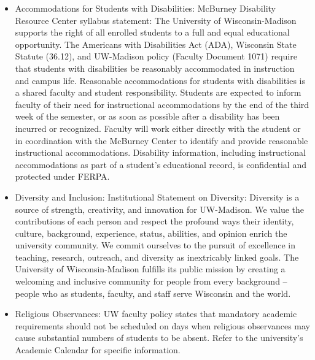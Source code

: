 \documentclass{article}
\begin{document}
\begin{itemize}
    \item Accommodations for Students with Disabilities: McBurney Disability Resource Center syllabus statement: The University of Wisconsin-Madison supports the right of all enrolled students to a full and equal educational opportunity. The Americans with Disabilities Act (ADA), Wisconsin State Statute (36.12), and UW-Madison policy (Faculty Document 1071) require that students with disabilities be reasonably accommodated in instruction and campus life. Reasonable accommodations for students with disabilities is a shared faculty and student responsibility. Students are expected to inform faculty of their need for instructional accommodations by the end of the third week of the semester, or as soon as possible after a disability has been incurred or recognized. Faculty will work either directly with the student or in coordination with the McBurney Center to identify and provide reasonable instructional accommodations. Disability information, including instructional accommodations as part of a student's educational record, is confidential and protected under FERPA.
    \item Diversity and Inclusion: Institutional Statement on Diversity: Diversity is a source of strength, creativity, and innovation for UW-Madison. We value the contributions of each person and respect the profound ways their identity, culture, background, experience, status, abilities, and opinion enrich the university community. We commit ourselves to the pursuit of excellence in teaching, research, outreach, and diversity as inextricably linked goals. The University of Wisconsin-Madison fulfills its public mission by creating a welcoming and inclusive community for people from every background -- people who as students, faculty, and staff serve Wisconsin and the world.
    \item Religious Observances: UW faculty policy states that mandatory academic requirements should not be scheduled on days when religious observances may cause substantial numbers of students to be absent. Refer to the university’s Academic Calendar for specific information.
\end{itemize}
\end{document}
